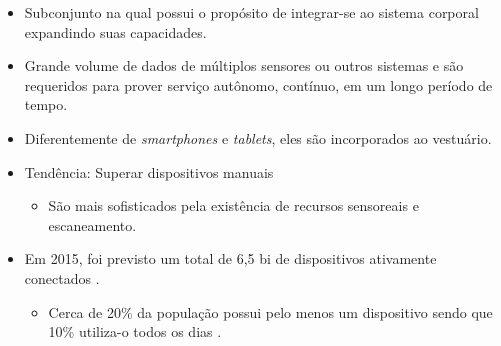       \begin{frame}{\Wearables} \vspace{-1em}
         \begin{itemize} \setlength{\itemsep}{0.9em}
            \item Subconjunto na qual possui o propósito de integrar-se ao sistema corporal expandindo suas capacidades.
            
            \item Grande volume de dados de múltiplos sensores ou outros sistemas e são requeridos para prover serviço autônomo, contínuo, em um longo período de tempo.
            
            \item Diferentemente de \textit{smartphones} e \textit{tablets}, eles são incorporados ao vestuário.
            
            \item Tendência: Superar dispositivos manuais
            \begin{itemize}
               \item  São mais sofisticados pela existência de recursos sensoreais e escaneamento.
            \end{itemize}
      
            \item Em 2015, foi previsto um total de 6,5 bi de dispositivos ativamente conectados \cite{RobvanderMeulen2015}.   
            \begin{itemize}
               \item Cerca de 20\% da população possui pelo menos um dispositivo sendo que 10\% utiliza-o todos os dias \cite{lee2016information}.
            \end{itemize}
      
         \end{itemize}
      \end{frame}  
      

